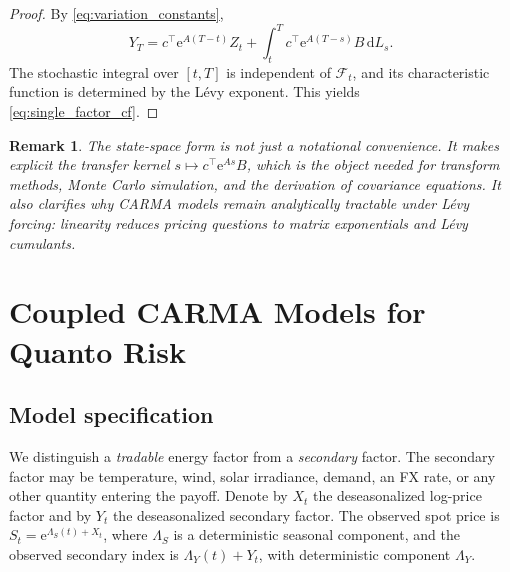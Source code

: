 \documentclass[10pt,reqno]{amsart}
\newtheorem{remark}[theorem]{Remark}
\newcommand{\F}{\mathcal{F}}
\newcommand{\1}{\mathbbm{1}}
\newcommand{\dd}{\mathrm{d}}
\newcommand{\ee}{\mathrm{e}}
\begin{document}
\begin{proof}
By \eqref{eq:variation_constants},
$$
Y_T
= c^\top \ee^{A(T-t)} Z_t
  + \int_t^T c^\top \ee^{A(T-s)} B\,\dd L_s.
$$
The stochastic integral over $[t,T]$ is independent of $\F_t$, and its
characteristic function is determined by the Lévy exponent. This yields
\eqref{eq:single_factor_cf}.
\end{proof}

\begin{remark}
The state-space form is not just a notational convenience. It makes explicit the
transfer kernel $s \mapsto c^\top \ee^{As} B$, which is the object needed for
transform methods, Monte Carlo simulation, and the derivation of covariance
equations. It also clarifies why CARMA models remain analytically tractable
under Lévy forcing: linearity reduces pricing questions to matrix exponentials
and Lévy cumulants.
\end{remark}

\section{Coupled CARMA Models for Quanto Risk}\label{sec:coupled-carma-models}

\subsection{Model specification}

We distinguish a \emph{tradable} energy factor from a \emph{secondary} factor.
The secondary factor may be temperature, wind, solar irradiance, demand, an FX
rate, or any other quantity entering the payoff. Denote by $X_t$ the
deseasonalized log-price factor and by $Y_t$ the deseasonalized secondary
factor. The observed spot price is $S_t = \ee^{\Lambda_S(t)+X_t}$, where
$\Lambda_S$ is a deterministic seasonal component, and the observed secondary
index is $\Lambda_Y(t)+Y_t$, with deterministic component $\Lambda_Y$.
\end{document}
